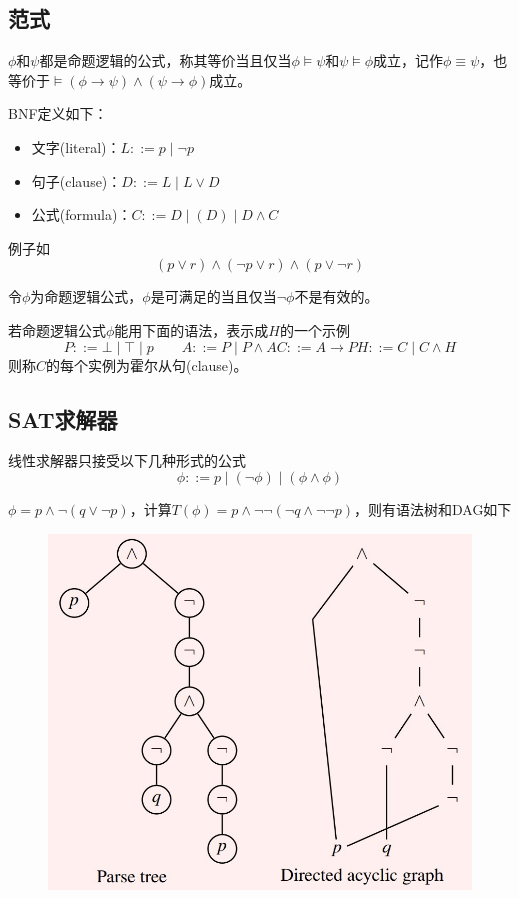 \subsection{范式}
\begin{definition}[语义等价]
$\phi$和$\psi$都是命题逻辑的公式，称其等价当且仅当$\phi\models\psi$和$\psi\models\phi$成立，记作$\phi\equiv\psi$，也等价于$\models(\phi\to\psi)\land(\psi\to\phi)$成立。
\end{definition}
\begin{definition}
BNF定义如下：
\begin{itemize}
	\item 文字(literal)：$L::=p\mid\lnot p$
	\item 句子(clause)：$D::=L\mid L\lor D$
	\item 公式(formula)：$C::=D\mid(D)\mid D\land C$
\end{itemize}
例子如
\[(p \lor r) \land (\lnot p \lor r) \land (p \lor \lnot r)\]
\end{definition}
\begin{definition}
令$\phi$为命题逻辑公式，$\phi$是可满足的当且仅当$\lnot\phi$不是有效的。
\end{definition}

\begin{definition}
若命题逻辑公式$\phi$能用下面的语法，表示成$H$的一个示例
\[P::=\bot\mid\top\mid p\qquad
A::=P\mid P\land A
C::=A\to P
H::=C\mid C\land H\]
则称$C$的每个实例为霍尔从句(clause)。
\end{definition}

\subsection{SAT求解器}
线性求解器只接受以下几种形式的公式
\[\phi::=p\mid(\lnot\phi)\mid(\phi\land\phi)\]
\begin{example}
$\phi=p\land\lnot(q\lor\lnot p)$，计算$T(\phi)=p\land\lnot\lnot(\lnot q\land\lnot\lnot p)$，则有语法树和DAG如下
\begin{figure}[H]
\centering
\includegraphics[width=0.5\linewidth]{fig/parse_tree_dag_eg.jpg}
\end{figure}
\end{example}